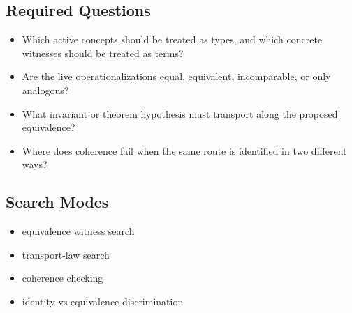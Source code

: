 \documentclass[11pt]{article}
\begin{document}
\subsection*{Required Questions}
\begin{itemize}[leftmargin=*,itemsep=0.2em]
\item Which active concepts should be treated as types, and which concrete witnesses should be treated as terms?
\item Are the live operationalizations equal, equivalent, incomparable, or only analogous?
\item What invariant or theorem hypothesis must transport along the proposed equivalence?
\item Where does coherence fail when the same route is identified in two different ways?
\end{itemize}
\subsection*{Search Modes}
\begin{itemize}[leftmargin=*,itemsep=0.2em]
\item equivalence witness search
\item transport-law search
\item coherence checking
\item identity-vs-equivalence discrimination
\end{itemize}
\end{document}
